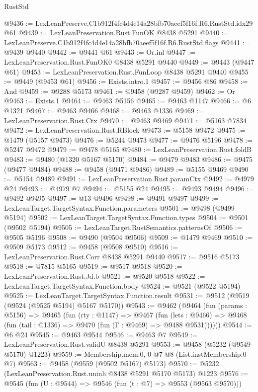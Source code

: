 \begin{lexlean}{RustStd}
\begin{coremodule}
@9436 := LexLeanPreserve.C1b912f4fc4d4e14a28bfb70aeef5f16f.R6.RustStd.idx29 @61
@9439 := LexLeanPreservation.Rust.FunOK @8438 @5291
@9440 := LexLeanPreserve.C1b912f4fc4d4e14a28bfb70aeef5f16f.R6.RustStd.flags
@9441 := @9439 @9440
@9442 := @9441 @61
@9443 := Or.inl
@9447 := LexLeanPreservation.Rust.FunOK0 @8438 @5291 @9440
@9449 := @9443 (@9447 @61)
@9453 := LexLeanPreservation.Rust.FunLoop @8438 @5291 @9440
@9455 := @9449 (@9453 @61)
@9456 := Exists.intro.{1}
@9457 := @9456 @86
@9458 := And
@9459 := @9288 @5173
@9461 := @9458 (@9287 @9459)
@9462 := Or
@9463 := Exists.{1}
@9464 := @9463 @5156
@9465 := @9463 @1147
@9466 := @6 @1321
@9467 := @9463 @9466
@9468 := @9463 @1336
@9469 := LexLeanPreservation.Rust.Ctx
@9470 := @9463 @9469
@9471 := @5163 @7834
@9472 := LexLeanPreservation.Rust.RBlock
@9473 := @5158 @9472
@9475 := @1479 (@5157 @9473)
@9476 := @5244 @9473
@9477 := @9476 @5196
@9478 := @5247 @9472
@9479 := @9478 @5165
@9480 := LexLeanPreservation.Rust.foldB
@9483 := @9480 (@1320 @5167 @5170)
@9484 := @9479 @9483
@9486 := @9475 (@9477 @9484)
@9488 := @9458 (@9471 @9486)
@9489 := @5155 @9469
@9490 := @5154 @9489
@9491 := LexLeanPreservation.Rust.paramCtx
@9492 := @4979 @24
@9493 := @4979 @7
@9494 := @5155 @24
@9495 := @9493 @9494
@9496 := @9492 @9495
@9497 := @13 @9496
@9498 := @9491 @9497
@9499 := LexLeanTarget.TargetSyntax.Function.parameters
@9501 := @9498 (@9499 @5194)
@9502 := LexLeanTarget.TargetSyntax.Function.types
@9504 := @9501 (@9502 @5194)
@9505 := LexLeanTarget.RustSemantics.patternsOf
@9506 := @9505 @5196
@9508 := @9490 (@9504 @9506)
@9509 := @1479 @9469
@9510 := @9509 @5173
@9512 := @9458 (@9508 @9510)
@9516 := LexLeanPreservation.Rust.Corr @8438 @5291 @9440
@9517 := @9516 @5173
@9518 := @7815 @5165
@9519 := @9517 @9518
@9520 := LexLeanPreservation.Rust.Jd.b
@9521 := @9520 @9518
@9522 := LexLeanTarget.TargetSyntax.Function.body
@9524 := @9521 (@9522 @5194)
@9525 := LexLeanTarget.TargetSyntax.Function.result
@9531 := @9512 (@9519 (@9524 (@9525 @5194) @5167 @5170))
@9543 := @9462
    (@9464
      (fun (params : @5156) =>
      @9465
        (fun (rty : @1147) =>
        @9467
          (fun (lets : @9466) =>
          @9468 (fun (tail : @1336) => @9470 (fun (Γ : @9469) => @9488 @9531))))))
@9544 := @6 @24
@9545 := @9463 @9544
@9546 := @9463 @7
@9549 := LexLeanPreservation.Rust.validU @8438 @5291
@9553 := @9458 (@5232 (@9549 @5170) @1223)
@9559 := Membership.mem.{0, 0} @7 @8 (List.instMembership.{0} @7)
@9563 := @9458 (@9559 (@9502 @5167) @5173)
@9570 := @5232 (LexLeanPreservation.Rust.uninh @8438 @5291 @5170 @5173) @1223
@9576 := @9545 (fun (U : @9544) => @9546 (fun (t : @7) => @9553 (@9563 @9570)))

\end{coremodule}
\end{lexlean}

